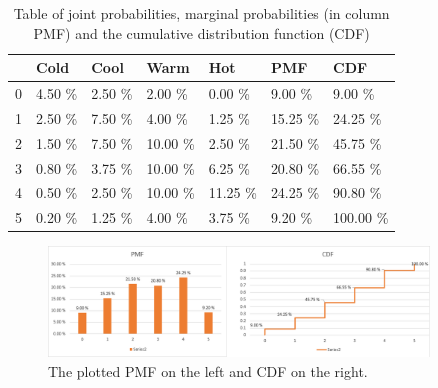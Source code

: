 \documentclass{article}
\begin{document}
\begin{table}[H]
	\centering
	\caption{Table of joint probabilities, marginal probabilities (in column PMF) and the cumulative distribution function (CDF)}
	\label{tab:my-table}
	\begin{tabular}{l|l|l|l|l|l|l|}
		\cline{2-7}
		& Cold    & Cool    & Warm     & Hot      & PMF      & CDF       \\ \hline
		\multicolumn{1}{|l|}{0} & 4.50 \% & 2.50 \% & 2.00 \%  & 0.00 \%  & 9.00 \%  & 9.00 \%   \\ \hline
		\multicolumn{1}{|l|}{1} & 2.50 \% & 7.50 \% & 4.00 \%  & 1.25 \%  & 15.25 \% & 24.25 \%  \\ \hline
		\multicolumn{1}{|l|}{2} & 1.50 \% & 7.50 \% & 10.00 \% & 2.50 \%  & 21.50 \% & 45.75 \%  \\ \hline
		\multicolumn{1}{|l|}{3} & 0.80 \% & 3.75 \% & 10.00 \% & 6.25 \%  & 20.80 \% & 66.55 \%  \\ \hline
		\multicolumn{1}{|l|}{4} & 0.50 \% & 2.50 \% & 10.00 \% & 11.25 \% & 24.25 \% & 90.80 \%  \\ \hline
		\multicolumn{1}{|l|}{5} & 0.20 \% & 1.25 \% & 4.00 \%  & 3.75 \%  & 9.20 \%  & 100.00 \% \\ \hline
	\end{tabular}
\end{table}

\begin{figure}
	\centering
	\includegraphics[width=0.9\textwidth]{plots.png}
	\caption{The plotted PMF on the left and CDF on the right.}
	\label{fig:plots}
\end{figure}
\end{document}
